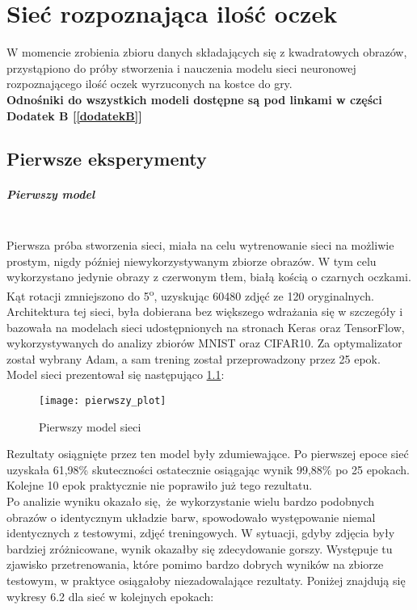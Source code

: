 
\chapter{Sieć rozpoznająca ilość oczek}
W momencie zrobienia zbioru danych składających się z kwadratowych obrazów, przystąpiono
do próby stworzenia i nauczenia modelu sieci neuronowej rozpoznającego ilość oczek
wyrzuconych na kostce do gry.\\
\textbf{Odnośniki do wszystkich modeli dostępne są pod linkami w części Dodatek B [\ref{dodatekB}] }

\section{Pierwsze eksperymenty}
\paragraph{Pierwszy model} \mbox{}\\
Pierwsza próba stworzenia sieci, miała
na celu wytrenowanie sieci na możliwie prostym, nigdy później niewykorzystywanym zbiorze obrazów.
W tym celu wykorzystano jedynie obrazy z czerwonym tłem, białą kością o czarnych oczkami.
Kąt rotacji zmniejszono do 5\textsuperscript{o}, uzyskując 60480 zdjęć ze 120 oryginalnych.\\
Architektura tej sieci, była dobierana bez większego wdrażania się w szczegóły i
bazowała na modelach sieci udostępnionych na stronach Keras oraz TensorFlow,
wykorzystywanych do analizy zbiorów MNIST oraz CIFAR10. Za optymalizator został wybrany
Adam, a sam trening został przeprowadzony przez 25 epok.
Model sieci prezentował się następująco \ref{fig:first_model}: \newpage
\begin{figure}[h!]
\centering
\texttt{[image: pierwszy\_plot]}
\caption{Pierwszy model sieci}
\label{fig:first_model}
\end{figure}
Rezultaty osiągnięte przez ten model były zdumiewające. Po pierwszej epoce
sieć uzyskała 61,98\% skuteczności ostatecznie osiągając wynik 99,88\% po 25 epokach.
Kolejne 10 epok praktycznie nie poprawiło już tego rezultatu.\\
Po analizie wyniku okazało się, że wykorzystanie wielu bardzo podobnych obrazów o identycznym
układzie barw, spowodowało występowanie niemal identycznych z testowymi, zdjęć treningowych.
W sytuacji, gdyby zdjęcia były bardziej zróżnicowane, wynik okazałby się zdecydowanie gorszy.
Występuje tu zjawisko przetrenowania, które pomimo bardzo dobrych wyników na zbiorze testowym,
w praktyce osiągałoby niezadowalające rezultaty. Poniżej znajdują się wykresy 6.2
dla sieć w kolejnych epokach:

